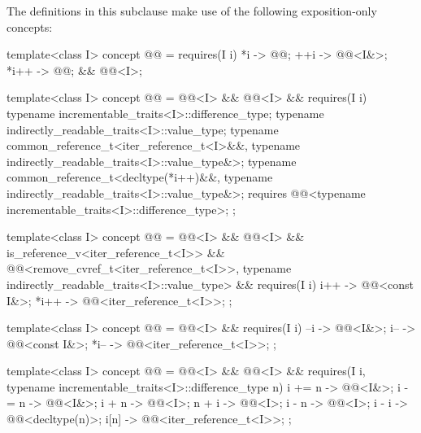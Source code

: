 \pnum
The definitions in this subclause make use of the following
exposition-only concepts:

\begin{codeblock}
template<class I>
concept @@ =
  requires(I i) {
    {   *i } -> @@;
    {  ++i } -> @@<I&>;
    { *i++ } -> @@;
  } && @@<I>;

template<class I>
concept @@ =
  @@<I> && @@<I> && requires(I i) {
    typename incrementable_traits<I>::difference_type;
    typename indirectly_readable_traits<I>::value_type;
    typename common_reference_t<iter_reference_t<I>&&,
                                typename indirectly_readable_traits<I>::value_type&>;
    typename common_reference_t<decltype(*i++)&&,
                                typename indirectly_readable_traits<I>::value_type&>;
    requires @@<typename incrementable_traits<I>::difference_type>;
  };

template<class I>
concept @@ =
  @@<I> && @@<I> &&
  is_reference_v<iter_reference_t<I>> &&
  @@<remove_cvref_t<iter_reference_t<I>>,
          typename indirectly_readable_traits<I>::value_type> &&
  requires(I i) {
    {  i++ } -> @@<const I&>;
    { *i++ } -> @@<iter_reference_t<I>>;
  };

template<class I>
concept @@ =
  @@<I> && requires(I i) {
    {  --i } -> @@<I&>;
    {  i-- } -> @@<const I&>;
    { *i-- } -> @@<iter_reference_t<I>>;
  };

template<class I>
concept @@ =
  @@<I> && @@<I> &&
  requires(I i, typename incrementable_traits<I>::difference_type n) {
    { i += n } -> @@<I&>;
    { i -= n } -> @@<I&>;
    { i +  n } -> @@<I>;
    { n +  i } -> @@<I>;
    { i -  n } -> @@<I>;
    { i -  i } -> @@<decltype(n)>;
    {  i[n]  } -> @@<iter_reference_t<I>>;
  };
\end{codeblock}

